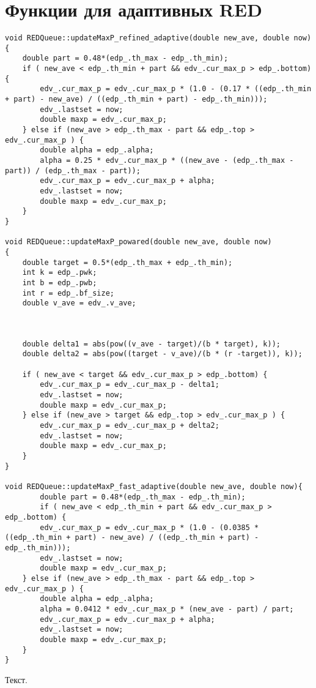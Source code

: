 \section{Функции для адаптивных RED}
\begin{verbatim}
void REDQueue::updateMaxP_refined_adaptive(double new_ave, double now)
{
  	double part = 0.48*(edp_.th_max - edp_.th_min);
 	if ( new_ave < edp_.th_min + part && edv_.cur_max_p > edp_.bottom) {
 		edv_.cur_max_p = edv_.cur_max_p * (1.0 - (0.17 * ((edp_.th_min + part) - new_ave) / ((edp_.th_min + part) - edp_.th_min))); 
 		edv_.lastset = now;
 		double maxp = edv_.cur_max_p;
 	} else if (new_ave > edp_.th_max - part && edp_.top > edv_.cur_max_p ) {
 		double alpha = edp_.alpha;
 		alpha = 0.25 * edv_.cur_max_p * ((new_ave - (edp_.th_max - part)) / (edp_.th_max - part));
 		edv_.cur_max_p = edv_.cur_max_p + alpha;
 		edv_.lastset = now;
 		double maxp = edv_.cur_max_p;
 	}
}

void REDQueue::updateMaxP_powared(double new_ave, double now)
{
  	double target = 0.5*(edp_.th_max + edp_.th_min);
  	int k = edp_.pwk;
  	int b = edp_.pwb;
  	int r = edp_.bf_size;
  	double v_ave = edv_.v_ave;
  	
  	
  	
  	double delta1 = abs(pow((v_ave - target)/(b * target), k));
  	double delta2 = abs(pow((target - v_ave)/(b * (r -target)), k));
 	
 	if ( new_ave < target && edv_.cur_max_p > edp_.bottom) {
 		edv_.cur_max_p = edv_.cur_max_p - delta1; 
 		edv_.lastset = now;
 		double maxp = edv_.cur_max_p; 
 	} else if (new_ave > target && edp_.top > edv_.cur_max_p ) {
 		edv_.cur_max_p = edv_.cur_max_p + delta2;
 		edv_.lastset = now;
 		double maxp = edv_.cur_max_p;
 	}
}

void REDQueue::updateMaxP_fast_adaptive(double new_ave, double now){
	  	double part = 0.48*(edp_.th_max - edp_.th_min);
		if ( new_ave < edp_.th_min + part && edv_.cur_max_p > edp_.bottom) {
 		edv_.cur_max_p = edv_.cur_max_p * (1.0 - (0.0385 * ((edp_.th_min + part) - new_ave) / ((edp_.th_min + part) - edp_.th_min))); 
 		edv_.lastset = now;
 		double maxp = edv_.cur_max_p;
 	} else if (new_ave > edp_.th_max - part && edp_.top > edv_.cur_max_p ) {
 		double alpha = edp_.alpha;
 		alpha = 0.0412 * edv_.cur_max_p * (new_ave - part) / part;
 		edv_.cur_max_p = edv_.cur_max_p + alpha;
 		edv_.lastset = now;
 		double maxp = edv_.cur_max_p;
 	}
}
\end{verbatim}




\label{app2:sec2}

Текст.

